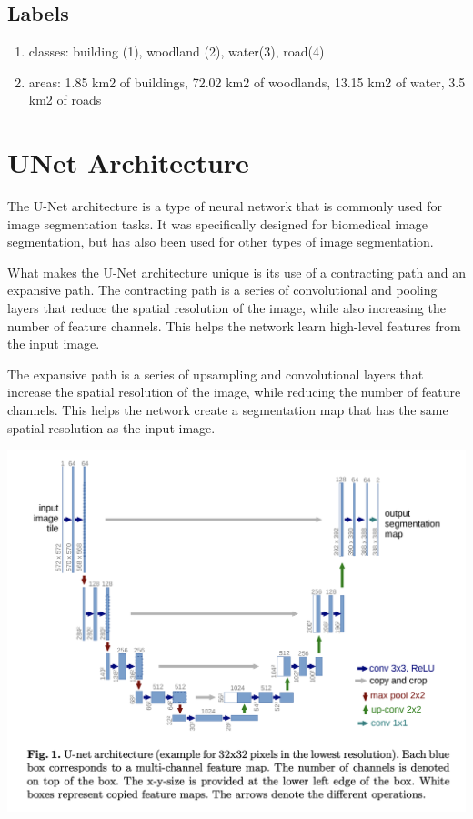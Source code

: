 \subsection{Labels}
\begin{enumerate}
    \item classes: building (1), woodland (2), water(3), road(4)
    \item areas: 1.85 km2 of buildings, 72.02 km2 of woodlands, 13.15 km2 of water, 3.5 km2 of roads
\end{enumerate}

\section{UNet Architecture}
The U-Net architecture is a type of neural network that is commonly used for image segmentation tasks. It was specifically designed for biomedical image segmentation, but has also been used for other types of image segmentation.

What makes the U-Net architecture unique is its use of a contracting path and an expansive path. The contracting path is a series of convolutional and pooling layers that reduce the spatial resolution of the image, while also increasing the number of feature channels. This helps the network learn high-level features from the input image.

The expansive path is a series of upsampling and convolutional layers that increase the spatial resolution of the image, while reducing the number of feature channels. This helps the network create a segmentation map that has the same spatial resolution as the input image.


\includegraphics[scale=0.6]{images/1.png}
